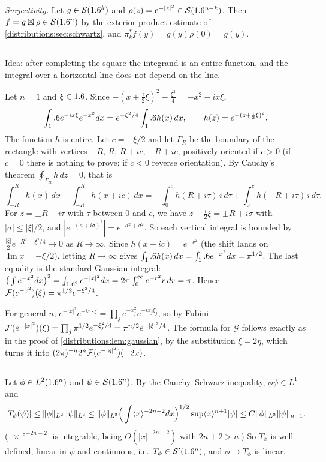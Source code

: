 \emph{Surjectivity.} Let $g\in\mathcal{S}(1.6^k)$ and $\rho(z)=e^{-|z|^2}\in\mathcal{S}(1.6^{n-k})$. Then
$f=g\boxtimes\rho\in\mathcal{S}(1.6^n)$ by the exterior product estimate of
\cref{distributions:sec:schwartz}, and $\pi_k^*f(y)=g(y)\rho(0)=g(y)$.

\subsection*{}
Idea: after completing the square the integrand is an entire function, and the
integral over a horizontal line does not depend on the line.

Let $n=1$ and $\xi\in1.6$. Since
$-(x+\frac i2\xi)^2-\frac{\xi^2}4=-x^2-ix\xi$,
\[
  \int_1.6 e^{-ix\xi}e^{-x^2}dx=e^{-\xi^2/4}\int_1.6 h(x)\,dx,\qquad h(z)=e^{-(z+\frac i2\xi)^2}.
\]
The function $h$ is entire. Let $c=-\xi/2$ and let $\Gamma_R$ be the boundary of the
rectangle with vertices $-R$, $R$, $R+ic$, $-R+ic$, positively oriented if $c>0$
(if $c=0$ there is nothing to prove; if $c<0$ reverse orientation). By Cauchy's theorem
$\oint_{\Gamma_R}h\,dz=0$, that is
\[
  \int_{-R}^Rh(x)\,dx-\int_{-R}^Rh(x+ic)\,dx
  =-\int_0^{c}h(R+i\tau)\,i\,d\tau+\int_0^{c}h(-R+i\tau)\,i\,d\tau .
\]
For $z=\pm R+i\tau$ with $\tau$ between $0$ and $c$, we have $z+\frac i2\xi=\pm R+i\sigma$
with $|\sigma|\le|\xi|/2$, and $|e^{-(a+i\sigma)^2}|=e^{-a^2+\sigma^2}$. So each vertical
integral is bounded by $\frac{|\xi|}2e^{-R^2+\xi^2/4}\to0$ as $R\to\infty$. Since
$h(x+ic)=e^{-x^2}$ (the shift lands on $\operatorname{Im}x=-\xi/2$), letting $R\to\infty$
gives $\int_1.6 h(x)\,dx=\int_1.6 e^{-x^2}dx=\pi^{1/2}$. The last equality is the standard
Gaussian integral: $\big(\int e^{-x^2}dx\big)^2=\int_{1.6^2}e^{-|x|^2}dx
=2\pi\int_0^\infty e^{-r^2}r\,dr=\pi$. Hence $\mathcal{F}(e^{-x^2})(\xi)=\pi^{1/2}e^{-\xi^2/4}$.

For general $n$, $e^{-|x|^2}e^{-ix\cdot\xi}=\prod_je^{-x_j^2}e^{-ix_j\xi_j}$, so by Fubini
$\mathcal{F}(e^{-|x|^2})(\xi)=\prod_j\pi^{1/2}e^{-\xi_j^2/4}=\pi^{n/2}e^{-|\xi|^2/4}$. The formula
for $\mathcal{G}$ follows exactly as in the proof of \cref{distributions:lem:gaussian},
by the substitution $\xi=2\eta$, which turns it into $(2\pi)^{-n}2^n\mathcal{F}(e^{-|\eta|^2})(-2x)$.

\subsection*{}
Let $\phi\in L^2(1.6^n)$ and $\psi\in\mathcal{S}(1.6^n)$. By the Cauchy--Schwarz inequality,
$\phi\psi\in L^1$ and
\[
  |T_\phi(\psi)|\le\lVert \phi\rVert_{L^2}\lVert \psi\rVert_{L^2}
  \le\lVert \phi\rVert_{L^2}\Big(\int\langle x\rangle^{-2n-2}dx\Big)^{1/2}\sup\langle x\rangle^{n+1}|\psi|
  \le C\lVert \phi\rVert_{L^2}\lVert \psi\rVert_{n+1}.
\]
($\ang{x}^{-2n-2}$ is integrable, being $O(|x|^{-2n-2})$ with $2n+2>n$.) So $T_\phi$ is
well defined, linear in $\psi$ and continuous, i.e.\ $T_\phi\in\mathcal{S}'(1.6^n)$, and
$\phi\mapsto T_\phi$ is linear.

